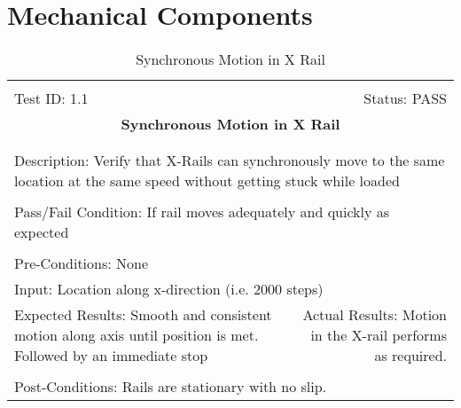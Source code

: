 \documentclass[titlepage]{article}
\begin{document}
\section{Mechanical Components}
\begin{center}
\begin{table}[h!]
\begin{tabular}{|l r|}\hline&\\[-2mm]
	Test ID: 1.1	&Status: PASS\\[-3mm]
	\multicolumn{2}{|c|}{\textbf{\large{Synchronous Motion in X Rail}}}\\&\\\hline&\\[-3mm]
	\multicolumn{2}{|p{\textwidth}|}{Description: Verify that X-Rails can synchronously move to the same location at the same speed without getting stuck while loaded}\\[1mm]\hline&\\[-3mm]
	\multicolumn{2}{|p{\textwidth}|}{Pass/Fail Condition: If rail moves adequately and quickly as expected}\\[1mm]\hline&\\[-3mm]
	\multicolumn{2}{|p{\textwidth}|}{Pre-Conditions: None}\\[4mm]
	\multicolumn{2}{|p{\textwidth}|}{Input: Location along x-direction (i.e. 2000 steps)}\\[2mm]\hline
	\multicolumn{1}{|p{0.49\textwidth}}{Expected Results: Smooth and consistent motion along axis until position is met. Followed by an immediate stop}	&\multicolumn{1}{|p{0.45\textwidth}|}{Actual Results: Motion in the X-rail performs as required.}\\\hline&\\[-3mm]
	\multicolumn{2}{|p{\textwidth}|}{Post-Conditions: Rails are stationary with no slip.}\\\hline
\end{tabular}
\caption{Synchronous Motion in X Rail}
\end{table}
\end{center}
\end{document}
